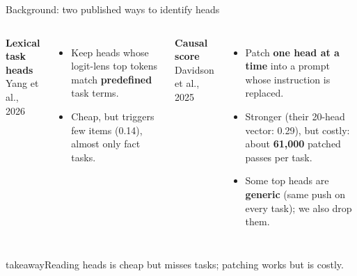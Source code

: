 \documentclass[aspectratio=169,11pt,xcolor=table]{beamer}
\newcommand{\takeaway}[1]{\vfill
  \begin{beamercolorbox}[wd=\textwidth,sep=6pt]{takeaway}\small #1\end{beamercolorbox}}
\begin{document}
\begin{frame}{Background: two published ways to identify heads}
\begin{columns}[T]
\textbf{Lexical task heads}\\{\small Yang et al., 2026}
\begin{itemize}
\item Keep heads whose logit-lens top tokens match \textbf{predefined} task terms.
\item Cheap, but triggers few items (0.14), almost only fact tasks.
\end{itemize}

\textbf{Causal score}\\{\small Davidson et al., 2025}
\begin{itemize}
\item Patch \textbf{one head at a time} into a prompt whose instruction is replaced.
\item Stronger (their 20-head vector: 0.29), but costly:
      about \textbf{61{,}000} patched passes per task.
\item Some top heads are \textbf{generic} (same push on every task); we also drop them.
\end{itemize}
\end{columns}

\takeaway{Reading heads is cheap but misses tasks; patching works but is costly.}
\end{frame}
\end{document}
